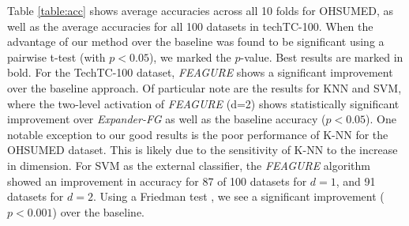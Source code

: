 \documentclass[letterpaper]{article} %
\theoremstyle{definition}
\begin{document}
Table \ref{table:acc} shows average accuracies across all 10 folds for OHSUMED, as well as the average accuracies for all 100 datasets in techTC-100. When the advantage of our method over the baseline was found to be significant using a pairwise t-test (with $p<0.05$), we marked the $p$-value. Best results are marked in bold.
For the TechTC-100 dataset, \emph{FEAGURE} shows a significant improvement over the baseline approach. %
Of particular note are the results for KNN and SVM, where the two-level activation of \emph{FEAGURE} (d=2) shows statistically significant improvement over \emph{Expander-FG} as well as the baseline accuracy ($p < 0.05$). 
One notable exception to our good results is the poor performance of K-NN for the OHSUMED dataset. This is likely due to the sensitivity of K-NN to the increase in dimension. 
For SVM as the external classifier, the \emph{FEAGURE} algorithm showed an improvement in accuracy for 87 of 100 datasets for $d=1$, and 91 datasets for $d=2$.
Using a Friedman test%
, we see a significant improvement ($p<0.001$) over the baseline.

\end{document}
